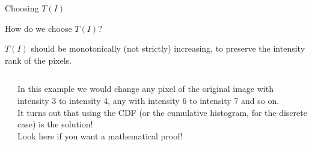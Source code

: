 \documentclass[9pt, aspectratio=169]{beamer}
\begin{document}
\begin{frame}
    {Choosing $T(I)$}

    How do we choose $T(I)$?

    $T(I)$ should be monotonically (not strictly) increasing, to preserve the intensity rank of the pixels.

    \begin{columns}
        \begin{column}{.6\textwidth}
        \end{column}
        \begin{column}{.4\textwidth}
            In this example we would change any pixel of the original image with intensity 3 to intensity 4, any with intensity 6 to intensity 7 and so on.\\
            \pause
            It turns out that using the CDF (or the cumulative histogram, for the discrete case) is the solution!\\
            Look here if you want a mathematical proof!
        \end{column}
    \end{columns}
\end{frame}
\end{document}

